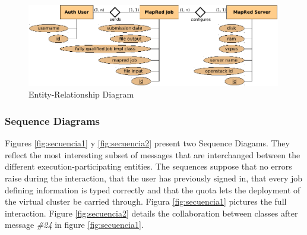 \begin{figure}[bp]
\begin{center}
\includegraphics[width=0.99\textwidth]{imagenes/032.pdf}
 \caption{Entity-Relationship Diagram}
\label{fig:entidadrelacion}
\end{center}
\end{figure}

\subsubsection{Sequence Diagrams}\label{subsubsec:secuencia}
\noindent Figures \ref{fig:secuencia1} y \ref{fig:secuencia2} present two Sequence Diagams. They reflect the most interesting subset of messages that are interchanged between the different execution-participating entities. The sequences suppose that no errors raise during the interaction, that the user has previously signed in, that every job defining information is typed correctly and that the quota lets the deployment of the virtual cluster be carried through. Figura \ref{fig:secuencia1} pictures the full interaction. Figure \ref{fig:secuencia2} details the collaboration between classes after message \emph{\#24} in figure \ref{fig:secuencia1}.

